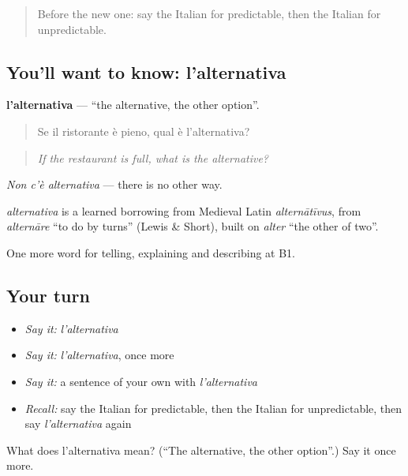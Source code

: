 \begin{quote}
Before the new one: say the Italian for predictable, then the Italian for unpredictable.
\end{quote}

\subsection*{You'll want to know: l'alternativa}
\textbf{l'alternativa} — \textquotedblleft{}the alternative, the other option\textquotedblright{}.

\begin{quote}
Se il ristorante è pieno, qual è l'alternativa?
\end{quote}

\begin{quote}
\emph{If the restaurant is full, what is the alternative?}
\end{quote}

\emph{Non c'è alternativa} — there is no other way.

\begin{cousinweb}
\emph{alternativa} is a learned borrowing from Medieval Latin \emph{alternātīvus}, from \emph{alternāre} \textquotedblleft{}to do by turns\textquotedblright{} (Lewis \& Short), built on \emph{alter} \textquotedblleft{}the other of two\textquotedblright{}.
\end{cousinweb}

\begin{grammarlens}[title={What you've built}]
One more word for telling, explaining and describing at B1.
\end{grammarlens}

\subsection*{Your turn}
\begin{itemize}
\raggedright
  \item \emph{Say it:} \emph{l'alternativa}
  \item \emph{Say it:} \emph{l'alternativa}, once more
  \item \emph{Say it:} a sentence of your own with \emph{l'alternativa}
  \item \emph{Recall:} say the Italian for predictable, then the Italian for unpredictable, then say \emph{l'alternativa} again
\end{itemize}

\begin{tcolorbox}[breakable,colback=teal!4,colframe=teal!35!black,title={Before you move on}]
What does l'alternativa mean? (\textquotedblleft{}The alternative, the other option\textquotedblright{}.) Say it once more.
\end{tcolorbox}
